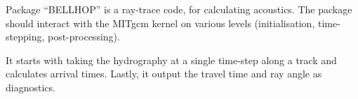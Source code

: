 
Package ``BELLHOP'' is a ray-trace code, for calculating acoustics.
The package should interact with the MITgcm kernel on various levels 
(initialisation, time-stepping, post-processing).

It starts with taking the hydrography at a single time-step along a track and 
calculates arrival times. Lastly, it output the travel time and ray angle as
diagnostics.
